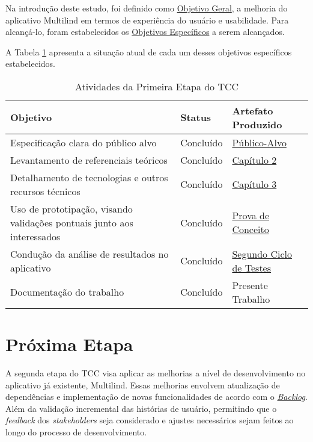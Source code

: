 Na introdução deste estudo, foi definido como \hyperref[sec:Objetivos]{Objetivo Geral}, a melhoria do aplicativo Multilind em termos de experiência do usuário e usabilidade. 
Para alcançá-lo, foram estabelecidos os \hyperref[sec:Objetivos]{Objetivos Específicos} a serem alcançados.

A Tabela \ref{tab08} apresenta a situação atual de cada um desses objetivos específicos estabelecidos.

\begin{table}[h!]
	\centering
	\caption{Atividades da Primeira Etapa do TCC}
	\label{tab08}
	\begin{tabularx}{\textwidth}{p{8cm}|p{2cm}|p{4cm}}
	\hline
    Objetivo                                                        & Status       & Artefato Produzido             \\ \hline
    Especificação clara do público alvo                                                     & Concluído    & \hyperref[Publico-Alvo]{Público-Alvo}              \\
    Levantamento de referenciais teóricos                                          & Concluído    & \hyperref[chap:Referencial]{Capítulo 2}                   \\
    Detalhamento de tecnologias e outros recursos técnicos                                       & Concluído    & \hyperref[chap:ReferencialTech]{Capítulo 3}                    \\
    Uso de prototipação, visando validações pontuais junto aos interessados                                      & Concluído    & \hyperref[sec:Prova de Conceito]{Prova de Conceito}                   \\
    Condução da análise de resultados no aplicativo                                          & Concluído    & \hyperref[sec:Segundo Ciclo]{Segundo Ciclo de Testes}                    \\
    Documentação do trabalho                       & Concluído    & Presente Trabalho         \\ \hline
	\end{tabularx}
\end{table}

\section{Próxima Etapa}
\label{sec:Proxima Etapa}
A segunda etapa do TCC visa aplicar as melhorias a nível de desenvolvimento no aplicativo já existente, Multilind. Essas melhorias envolvem atualização de dependências e implementação 
de novas funcionalidades de acordo com o \hyperref[sec:Backlog de Melhorias]{\textit{Backlog}}. Além da validação incremental das histórias de usuário, permitindo que o \textit{feedback} 
dos \textit{stakeholders} seja considerado e ajustes necessários sejam feitos ao longo do processo de desenvolvimento.